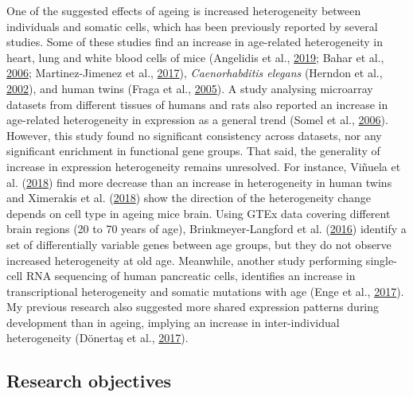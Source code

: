 \documentclass[12pt,twoside]{unicam}
\begin{document}
One of the suggested effects of ageing is increased heterogeneity between individuals and somatic cells, which has been previously reported by several studies. Some of these studies find an increase in age-related heterogeneity in heart, lung and white blood cells of mice (Angelidis et al., \protect\hyperlink{ref-Angelidis2019}{2019}; Bahar et al., \protect\hyperlink{ref-Bahar2006}{2006}; Martinez-Jimenez et al., \protect\hyperlink{ref-Martinez-Jimenez2017}{2017}), \emph{Caenorhabditis elegans} (Herndon et al., \protect\hyperlink{ref-Herndon2002}{2002}), and human twins (Fraga et al., \protect\hyperlink{ref-Fraga2005}{2005}). A study analysing microarray datasets from different tissues of humans and rats also reported an increase in age-related heterogeneity in expression as a general trend (Somel et al., \protect\hyperlink{ref-Somel2006}{2006}). However, this study found no significant consistency across datasets, nor any significant enrichment in functional gene groups. That said, the generality of increase in expression heterogeneity remains unresolved. For instance, Viñuela et al. (\protect\hyperlink{ref-Vinuela2018}{2018}) find more decrease than an increase in heterogeneity in human twins and Ximerakis et al. (\protect\hyperlink{ref-Ximerakis2018}{2018}) show the direction of the heterogeneity change depends on cell type in ageing mice brain. Using GTEx data covering different brain regions (20 to 70 years of age), Brinkmeyer-Langford et al. (\protect\hyperlink{ref-Brinkmeyer-Langford2016}{2016}) identify a set of differentially variable genes between age groups, but they do not observe increased heterogeneity at old age. Meanwhile, another study performing single-cell RNA sequencing of human pancreatic cells, identifies an increase in transcriptional heterogeneity and somatic mutations with age (Enge et al., \protect\hyperlink{ref-Enge2017}{2017}). My previous research also suggested more shared expression patterns during development than in ageing, implying an increase in inter-individual heterogeneity (Dönertaş et al., \protect\hyperlink{ref-Donertas2017}{2017}).

\hypertarget{research-objectives}{%
\subsection{Research objectives}\label{research-objectives}}
\end{document}

